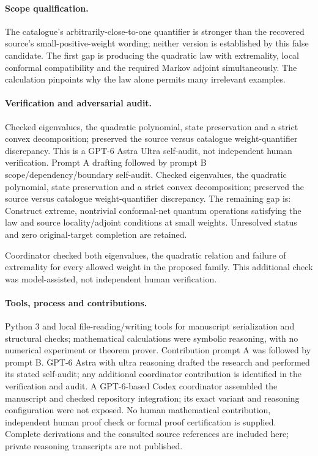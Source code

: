 \documentclass[11pt]{article}
\begin{document}
\paragraph{Scope qualification.} The catalogue's arbitrarily-close-to-one quantifier is stronger than the recovered source's small-positive-weight wording; neither version is established by this false candidate. The first gap is producing the quadratic law with extremality, local conformal compatibility and the required Markov adjoint simultaneously. The calculation pinpoints why the law alone permits many irrelevant examples.

\paragraph{Verification and adversarial audit.}
Checked eigenvalues, the quadratic polynomial, state preservation and a strict convex decomposition; preserved the source versus catalogue weight-quantifier discrepancy. This is a GPT-6 Astra Ultra self-audit, not independent human verification. Prompt A drafting followed by prompt B scope/dependency/boundary self-audit. Checked eigenvalues, the quadratic polynomial, state preservation and a strict convex decomposition; preserved the source versus catalogue weight-quantifier discrepancy. The remaining gap is: Construct extreme, nontrivial conformal-net quantum operations satisfying the law and source locality/adjoint conditions at small weights. Unresolved status and zero original-target completion are retained.

Coordinator checked both eigenvalues, the quadratic relation and failure of extremality for every allowed weight in the proposed family. This additional check was model-assisted, not independent human verification.

\paragraph{Tools, process and contributions.}
Python 3 and local file-reading/writing tools for manuscript serialization and structural checks; mathematical calculations were symbolic reasoning, with no numerical experiment or theorem prover. Contribution prompt A was followed by prompt B. GPT-6 Astra with ultra reasoning drafted the research and performed its stated self-audit; any additional coordinator contribution is identified in the verification and audit. A GPT-6-based Codex coordinator assembled the manuscript and checked repository integration; its exact variant and reasoning configuration were not exposed. No human mathematical contribution, independent human proof check or formal proof certification is supplied. Complete derivations and the consulted source references are included here; private reasoning transcripts are not published.
\end{document}

